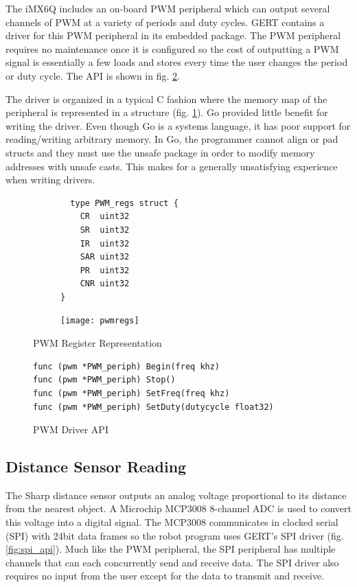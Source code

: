 The iMX6Q includes an on-board PWM peripheral which can output several channels of PWM
at a variety of periods and duty cycles. GERT contains a driver for this PWM peripheral in its embedded
package. The PWM peripheral requires no maintenance once it is configured so the cost of outputting
a PWM signal is essentially a few loads and stores every time the user changes the period or duty cycle.
The API is shown in fig. \ref{fig:pwm_api}.

The driver is organized in a typical C fashion where the memory map of the peripheral is represented in a structure (fig. \ref{fig:pwm_struct}).
Go provided little benefit for writing the driver. Even though Go is a systems language, it has poor
support for reading/writing arbitrary memory. In Go, the programmer cannot align or pad structs
and they must use the unsafe package in order to modify memory addresses with unsafe casts. This makes for a generally
unsatisfying experience when writing drivers.


\begin{figure}[h]
  \begin{subfigure}[t!]{0.5\textwidth}
  \begin{lstlisting}
  type PWM_regs struct {
	CR  uint32
	SR  uint32
	IR  uint32
	SAR uint32
	PR  uint32
	CNR uint32
}
  \end{lstlisting}
  \end{subfigure}
  \begin{subfigure}[t!]{0.5\textwidth}
 \texttt{[image: pwmregs]}
  \end{subfigure}
  \caption{PWM Register Representation} \label{fig:pwm_struct}
\end{figure}

\begin{figure}[h]
  \begin{lstlisting}
func (pwm *PWM_periph) Begin(freq khz)
func (pwm *PWM_periph) Stop()
func (pwm *PWM_periph) SetFreq(freq khz)
func (pwm *PWM_periph) SetDuty(dutycycle float32)
  \end{lstlisting}
  \caption{PWM Driver API} \label{fig:pwm_api}
\end{figure}

\subsection{Distance Sensor Reading}
The Sharp distance sensor outputs an analog voltage proportional to its distance from the nearest object.
A Microchip MCP3008 8-channel ADC is used to convert this voltage into a digital signal. The MCP3008 communicates in clocked
serial (SPI) with 24bit data frames so the robot program uses GERT's SPI driver (fig. \ref{fig:spi_api}). Much like the
PWM peripheral, the SPI peripheral has multiple channels that can each concurrently send and receive data. The SPI
driver also requires no input from the user except for the data to transmit and receive.


